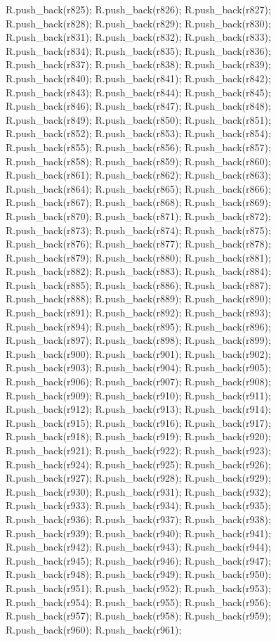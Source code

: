 \begin{DoxyCode}
{R.push_back(r825);
R.push_back(r826);
R.push_back(r827);
R.push_back(r828);
R.push_back(r829);
R.push_back(r830);
R.push_back(r831);
R.push_back(r832);
R.push_back(r833);
R.push_back(r834);
R.push_back(r835);
R.push_back(r836);
R.push_back(r837);
R.push_back(r838);
R.push_back(r839);
R.push_back(r840);
R.push_back(r841);
R.push_back(r842);
R.push_back(r843);
R.push_back(r844);
R.push_back(r845);
R.push_back(r846);
R.push_back(r847);
R.push_back(r848);
R.push_back(r849);
R.push_back(r850);
R.push_back(r851);
R.push_back(r852);
R.push_back(r853);
R.push_back(r854);
R.push_back(r855);
R.push_back(r856);
R.push_back(r857);
R.push_back(r858);
R.push_back(r859);
R.push_back(r860);
R.push_back(r861);
R.push_back(r862);
R.push_back(r863);
R.push_back(r864);
R.push_back(r865);
R.push_back(r866);
R.push_back(r867);
R.push_back(r868);
R.push_back(r869);
R.push_back(r870);
R.push_back(r871);
R.push_back(r872);
R.push_back(r873);
R.push_back(r874);
R.push_back(r875);
R.push_back(r876);
R.push_back(r877);
R.push_back(r878);
R.push_back(r879);
R.push_back(r880);
R.push_back(r881);
R.push_back(r882);
R.push_back(r883);
R.push_back(r884);
R.push_back(r885);
R.push_back(r886);
R.push_back(r887);
R.push_back(r888);
R.push_back(r889);
R.push_back(r890);
R.push_back(r891);
R.push_back(r892);
R.push_back(r893);
R.push_back(r894);
R.push_back(r895);
R.push_back(r896);
R.push_back(r897);
R.push_back(r898);
R.push_back(r899);
R.push_back(r900);
R.push_back(r901);
R.push_back(r902);
R.push_back(r903);
R.push_back(r904);
R.push_back(r905);
R.push_back(r906);
R.push_back(r907);
R.push_back(r908);
R.push_back(r909);
R.push_back(r910);
R.push_back(r911);
R.push_back(r912);
R.push_back(r913);
R.push_back(r914);
R.push_back(r915);
R.push_back(r916);
R.push_back(r917);
R.push_back(r918);
R.push_back(r919);
R.push_back(r920);
R.push_back(r921);
R.push_back(r922);
R.push_back(r923);
R.push_back(r924);
R.push_back(r925);
R.push_back(r926);
R.push_back(r927);
R.push_back(r928);
R.push_back(r929);
R.push_back(r930);
R.push_back(r931);
R.push_back(r932);
R.push_back(r933);
R.push_back(r934);
R.push_back(r935);
R.push_back(r936);
R.push_back(r937);
R.push_back(r938);
R.push_back(r939);
R.push_back(r940);
R.push_back(r941);
R.push_back(r942);
R.push_back(r943);
R.push_back(r944);
R.push_back(r945);
R.push_back(r946);
R.push_back(r947);
R.push_back(r948);
R.push_back(r949);
R.push_back(r950);
R.push_back(r951);
R.push_back(r952);
R.push_back(r953);
R.push_back(r954);
R.push_back(r955);
R.push_back(r956);
R.push_back(r957);
R.push_back(r958);
R.push_back(r959);
R.push_back(r960);
R.push_back(r961);
}
\end{DoxyCode}
